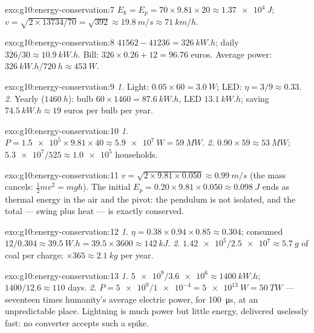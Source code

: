 \begin{solution}{exo:g10:energy-conservation:7}
$E_k = E_p = 70 \times 9.81 \times 20 \approx \qty{1.37e4}{J}$;
$v = \sqrt{2 \times 13734/70} = \sqrt{392} \approx \qty{19.8}{m/s}
\approx \qty{71}{km/h}$.
\end{solution}

\begin{solution}{exo:g10:energy-conservation:8}
$41562 - 41236 = \qty{326}{kW.h}$; daily $326/30 \approx
\qty{10.9}{kW.h}$. Bill: $326 \times 0.26 + 12 = 96.76$ euros.
Average power: $\qty{326}{kW.h}/\qty{720}{h} \approx \qty{453}{W}$.
\end{solution}

\begin{solution}{exo:g10:energy-conservation:9}
\emph{1.} Light: $0.05 \times 60 = \qty{3.0}{W}$; LED:
$\eta = 3/9 \approx 0.33$.
\emph{2.} Yearly ($\qty{1460}{h}$): bulb
$60 \times 1460 = \qty{87.6}{kW.h}$, LED $\qty{13.1}{kW.h}$;
saving $\qty{74.5}{kW.h} \approx 19$ euros per bulb per year.
\end{solution}

\begin{solution}{exo:g10:energy-conservation:10}
\emph{1.} $P = \num{1.5e5} \times 9.81 \times 40 \approx
\qty{5.9e7}{W} = \qty{59}{MW}$.
\emph{2.} $0.90 \times 59 \approx \qty{53}{MW}$;
$\num{5.3e7}/525 \approx \num{1.0e5}$ households.
\end{solution}

\begin{solution}{exo:g10:energy-conservation:11}
$v = \sqrt{2 \times 9.81 \times 0.050} \approx \qty{0.99}{m/s}$
(the mass cancels: $\tfrac12 m v^2 = mgh$). The initial
$E_p = 0.20 \times 9.81 \times 0.050 \approx \qty{0.098}{J}$ ends
as thermal energy in the air and the pivot: the pendulum is not
isolated, and the total --- swing plus heat --- is exactly
conserved.
\end{solution}

\begin{solution}{exo:g10:energy-conservation:12}
\emph{1.} $\eta = 0.38 \times 0.94 \times 0.85 \approx 0.304$;
consumed $12/0.304 \approx \qty{39.5}{W.h}
= 39.5 \times 3600 \approx \qty{142}{kJ}$.
\emph{2.} $\num{1.42e5}/\num{2.5e7} \approx \qty{5.7}{g}$ of coal
per charge; $\times 365 \approx \qty{2.1}{kg}$ per year.
\end{solution}

\begin{solution}{exo:g10:energy-conservation:13}
\emph{1.} $\num{5e9}/\num{3.6e6} \approx \qty{1400}{kW.h}$;
$1400/12.6 \approx 110$ days.
\emph{2.} $P = \num{5e9}/\num{1e-4} = \qty{5e13}{W} = \qty{50}{TW}$
--- seventeen times humanity's average electric power, for
\qty{100}{\micro s}, at an unpredictable place. Lightning is much
power but little energy, delivered uselessly fast: no converter
accepts such a spike.
\end{solution}

